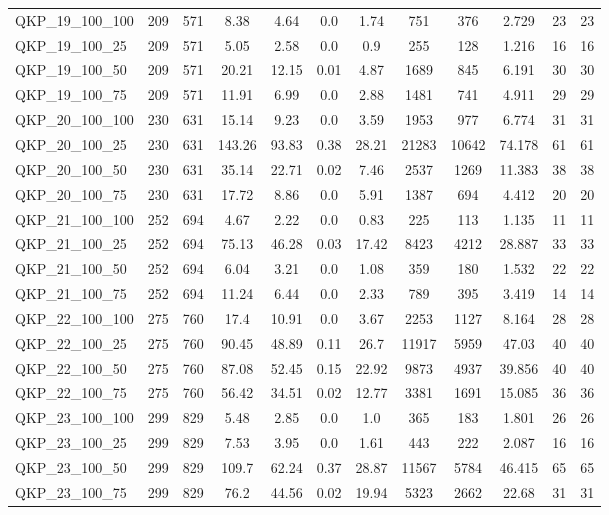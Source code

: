 \begin{table}[!h]
{\begin{tabular}{lccccccccccc}
QKP\_19\_100\_100 & 209 & 571 & 8.38 & 4.64 & 0.0 & 1.74 & 751 & 376 & 2.729 & 23 & 23\\
QKP\_19\_100\_25 & 209 & 571 & 5.05 & 2.58 & 0.0 & 0.9 & 255 & 128 & 1.216 & 16 & 16\\
QKP\_19\_100\_50 & 209 & 571 & 20.21 & 12.15 & 0.01 & 4.87 & 1689 & 845 & 6.191 & 30 & 30\\
QKP\_19\_100\_75 & 209 & 571 & 11.91 & 6.99 & 0.0 & 2.88 & 1481 & 741 & 4.911 & 29 & 29\\
QKP\_20\_100\_100 & 230 & 631 & 15.14 & 9.23 & 0.0 & 3.59 & 1953 & 977 & 6.774 & 31 & 31\\
QKP\_20\_100\_25 & 230 & 631 & 143.26 & 93.83 & 0.38 & 28.21 & 21283 & 10642 & 74.178 & 61 & 61\\
QKP\_20\_100\_50 & 230 & 631 & 35.14 & 22.71 & 0.02 & 7.46 & 2537 & 1269 & 11.383 & 38 & 38\\
QKP\_20\_100\_75 & 230 & 631 & 17.72 & 8.86 & 0.0 & 5.91 & 1387 & 694 & 4.412 & 20 & 20\\
QKP\_21\_100\_100 & 252 & 694 & 4.67 & 2.22 & 0.0 & 0.83 & 225 & 113 & 1.135 & 11 & 11\\
QKP\_21\_100\_25 & 252 & 694 & 75.13 & 46.28 & 0.03 & 17.42 & 8423 & 4212 & 28.887 & 33 & 33\\
QKP\_21\_100\_50 & 252 & 694 & 6.04 & 3.21 & 0.0 & 1.08 & 359 & 180 & 1.532 & 22 & 22\\
QKP\_21\_100\_75 & 252 & 694 & 11.24 & 6.44 & 0.0 & 2.33 & 789 & 395 & 3.419 & 14 & 14\\
QKP\_22\_100\_100 & 275 & 760 & 17.4 & 10.91 & 0.0 & 3.67 & 2253 & 1127 & 8.164 & 28 & 28\\
QKP\_22\_100\_25 & 275 & 760 & 90.45 & 48.89 & 0.11 & 26.7 & 11917 & 5959 & 47.03 & 40 & 40\\
QKP\_22\_100\_50 & 275 & 760 & 87.08 & 52.45 & 0.15 & 22.92 & 9873 & 4937 & 39.856 & 40 & 40\\
QKP\_22\_100\_75 & 275 & 760 & 56.42 & 34.51 & 0.02 & 12.77 & 3381 & 1691 & 15.085 & 36 & 36\\
QKP\_23\_100\_100 & 299 & 829 & 5.48 & 2.85 & 0.0 & 1.0 & 365 & 183 & 1.801 & 26 & 26\\
QKP\_23\_100\_25 & 299 & 829 & 7.53 & 3.95 & 0.0 & 1.61 & 443 & 222 & 2.087 & 16 & 16\\
QKP\_23\_100\_50 & 299 & 829 & 109.7 & 62.24 & 0.37 & 28.87 & 11567 & 5784 & 46.415 & 65 & 65\\
QKP\_23\_100\_75 & 299 & 829 & 76.2 & 44.56 & 0.02 & 19.94 & 5323 & 2662 & 22.68 & 31 & 31\\

\end{tabular}}
\end{table}
